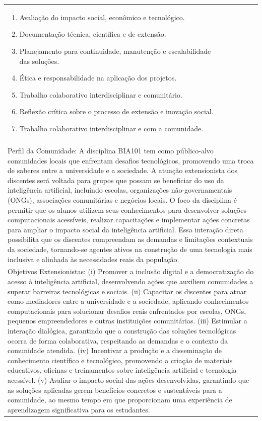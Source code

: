 \documentclass[11pt]{article}
\begin{document}
\begin{center}
\begin{longtable}{|p{4cm}|p{4cm}|p{4cm}|p{4cm}|}
{\begin{enumerate}
\item Avaliação do impacto social, econômico e tecnológico.
\item Documentação técnica, científica e de extensão.
\item Planejamento para continuidade, manutenção e escalabilidade das soluções.
\item Ética e responsabilidade na aplicação dos projetos.
\item Trabalho colaborativo interdisciplinar e comunitário.
\item Reflexão crítica sobre o processo de extensão e inovação social.
\item Trabalho colaborativo interdisciplinar e com a comunidade.\end{enumerate}}\\
\multicolumn{4}{|p{\dimexpr 16cm + 6\tabcolsep\relax}|}{}\\
\multicolumn{4}{|p{\dimexpr 16cm + 6\tabcolsep\relax}|}{Perfil da Comunidade: A disciplina BIA101 tem como público-alvo comunidades locais que enfrentam desafios tecnológicos, promovendo uma troca de saberes entre a universidade e a sociedade. A atuação extensionista dos discentes será voltada para grupos que possam se beneficiar do uso da inteligência artificial, incluindo escolas, organizações não-governamentais (ONGs), associações comunitárias e negócios locais. O foco da disciplina é permitir que os alunos utilizem seus conhecimentos para desenvolver soluções computacionais acessíveis, realizar capacitações e implementar ações concretas para ampliar o impacto social da inteligência artificial. Essa interação direta possibilita que os discentes compreendam as demandas e limitações contextuais da sociedade, tornando-se agentes ativos na construção de uma tecnologia mais inclusiva e alinhada às necessidades reais da população.}\\
\multicolumn{4}{|p{\dimexpr 16cm + 6\tabcolsep\relax}|}{Objetivos Extensionistas: (i) Promover a inclusão digital e a democratização do acesso à inteligência artificial, desenvolvendo ações que auxiliem comunidades a superar barreiras tecnológicas e sociais. (ii) Capacitar os discentes para atuar como mediadores entre a universidade e a sociedade, aplicando conhecimentos computacionais para solucionar desafios reais enfrentados por escolas, ONGs, pequenos empreendedores e outras instituições comunitárias. (iii) Estimular a interação dialógica, garantindo que a construção das soluções tecnológicas ocorra de forma colaborativa, respeitando as demandas e o contexto da comunidade atendida. (iv) Incentivar a produção e a disseminação de conhecimento científico e tecnológico, promovendo a criação de materiais educativos, oficinas e treinamentos sobre inteligência artificial e tecnologia acessível. (v) Avaliar o impacto social das ações desenvolvidas, garantindo que as soluções aplicadas gerem benefícios concretos e sustentáveis para a comunidade, ao mesmo tempo em que proporcionam uma experiência de aprendizagem significativa para os estudantes.}\\

\end{longtable}
\end{center}
\end{document}
